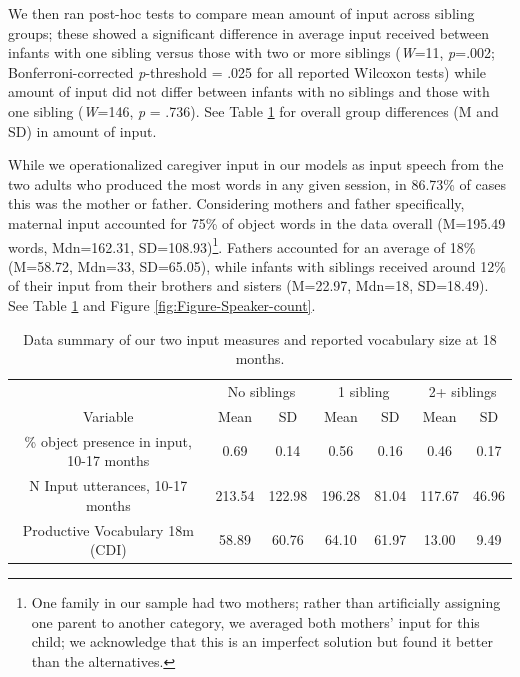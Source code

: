 \documentclass[
  man,mask,floatsintext]{apa6}
\begin{document}
We then ran post-hoc tests to compare mean amount of input across sibling groups; these showed a significant difference in average input received between infants with one sibling versus those with two or more siblings (\emph{W}=11, \emph{p}=.002; Bonferroni-corrected \emph{p}-threshold = .025 for all reported Wilcoxon tests) while amount of input did not differ between infants with no siblings and those with one sibling (\emph{W}=146, \emph{p} = .736). See Table \ref{tab:table-data-summary} for overall group differences (M and SD) in amount of input.

While we operationalized caregiver input in our models as input speech from the two adults who produced the most words in any given session, in 86.73\% of cases this was the mother or father. Considering mothers and father specifically, maternal input accounted for 75\% of object words in the data overall (M=195.49 words, Mdn=162.31, SD=108.93)\footnote{One family in our sample had two mothers; rather than artificially assigning one parent to another category, we averaged both mothers' input for this child; we acknowledge that this is an imperfect solution but found it better than the alternatives.}. Fathers accounted for an average of 18\% (M=58.72, Mdn=33, SD=65.05), while infants with siblings received around 12\% of their input from their brothers and sisters (M=22.97, Mdn=18, SD=18.49). See Table \ref{tab:table-data-summary} and Figure \ref{fig:Figure-Speaker-count}.

\begin{table}

\caption{\label{tab:table-data-summary}Data summary of our two input measures and reported vocabulary size at 18 months.}
\centering
\begin{tabular}[t]{ccccccc}
\toprule
\multicolumn{1}{c}{ } & \multicolumn{2}{c}{No siblings} & \multicolumn{2}{c}{1 sibling} & \multicolumn{2}{c}{2+ siblings} \\
\cmidrule(l{3pt}r{3pt}){2-3} \cmidrule(l{3pt}r{3pt}){4-5} \cmidrule(l{3pt}r{3pt}){6-7}
\multicolumn{1}{c}{Variable} & \multicolumn{1}{c}{Mean} & \multicolumn{1}{c}{SD} & \multicolumn{1}{c}{Mean} & \multicolumn{1}{c}{SD} & \multicolumn{1}{c}{Mean} & \multicolumn{1}{c}{SD} \\
\cmidrule(l{3pt}r{3pt}){1-1} \cmidrule(l{3pt}r{3pt}){2-2} \cmidrule(l{3pt}r{3pt}){3-3} \cmidrule(l{3pt}r{3pt}){4-4} \cmidrule(l{3pt}r{3pt}){5-5} \cmidrule(l{3pt}r{3pt}){6-6} \cmidrule(l{3pt}r{3pt}){7-7}
\% object presence in input, 10-17 months & 0.69 & 0.14 & 0.56 & 0.16 & 0.46 & 0.17\\
N Input utterances, 10-17 months & 213.54 & 122.98 & 196.28 & 81.04 & 117.67 & 46.96\\
Productive Vocabulary 18m (CDI) & 58.89 & 60.76 & 64.10 & 61.97 & 13.00 & 9.49\\
\bottomrule
\end{tabular}
\end{table}
\end{document}
